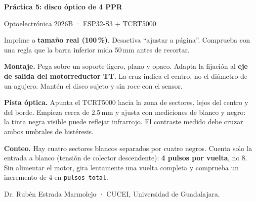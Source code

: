 \documentclass[11pt,letterpaper]{article}
\begin{document}
{\LARGE\bfseries Práctica 5: disco óptico de 4 PPR}\par
\smallskip
{\large Optoelectrónica 2026B · ESP32-S3 + TCRT5000}\par
\bigskip
Imprime a \textbf{tamaño real (100\,\%)}. Desactiva ``ajustar a página''.
Comprueba con una regla que la barra inferior mida 50\,mm antes de recortar.
\begin{center}
\end{center}
\textbf{Montaje.} Pega sobre un soporte ligero, plano y opaco. Adapta la fijación
al \textbf{eje de salida del motorreductor TT}. La cruz indica el centro, no el
diámetro de un agujero. Mantén el disco sujeto y sin roce con el sensor.
\medskip

\textbf{Pista óptica.} Apunta el TCRT5000 hacia la zona de sectores, lejos del
centro y del borde. Empieza cerca de 2.5\,mm y ajusta con mediciones de blanco y
negro: la tinta negra visible puede reflejar infrarrojo. El contraste medido
debe cruzar ambos umbrales de histéresis.
\medskip

\textbf{Conteo.} Hay cuatro sectores blancos separados por cuatro negros.
Cuenta solo la entrada a blanco (tensión de colector descendente):
\textbf{4 pulsos por vuelta}, no 8. Sin alimentar el motor, gira lentamente una
vuelta completa y comprueba un incremento de 4 en \texttt{pulsos\_total}.
\begin{center}
\end{center}
{\footnotesize Dr. Rubén Estrada Marmolejo · CUCEI, Universidad de Guadalajara.}
\end{document}
